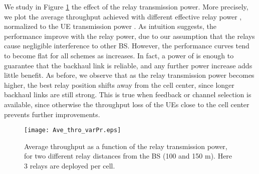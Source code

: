 \documentclass[12pt, letterpaper, onecolumn, draftcls]{IEEEtran}
\newcommand{\figw}{0.55\columnwidth}
\begin{document}
We study in Figure \ref{fig:Ave_thro_varPr} the effect of the relay transmission power. More precisely, we plot the average throughput achieved with different effective relay power , normalized to the UE transmission power .
As intuition suggests, the performance improve with the relay power, due to our assumption that the relays cause negligible interference to other BS. However, the performance curves tend to become flat for all schemes as  increases. In fact, a power of  is enough to guarantee that the backhaul link is reliable, and any further power increase adds little benefit.
As before, we observe that as the relay transmission power becomes higher, the best relay position shifts away from the cell center, since longer backhaul links are still strong. This is true when feedback or channel selection is available, since otherwise the throughput loss of the UEs close to the cell center prevents further improvements.
\begin{figure}
    \centering
    \texttt{[image: Ave\_thro\_varPr.eps]}
     \caption{\small Average throughput as a function of the relay transmission power, for two different relay distances from the BS (100 and 150 m). Here 3 relays are deployed per cell.}
     \vspace{-1cm}
  \label{fig:Ave_thro_varPr}
\end{figure}
\end{document}
